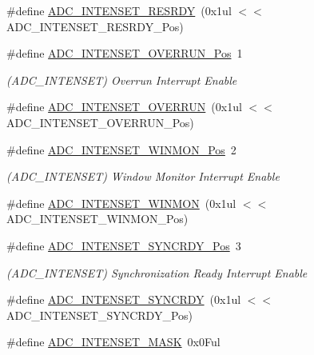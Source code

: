 \begin{DoxyCompactItemize}
\#define \mbox{\hyperlink{group___s_a_m_d21___a_d_c_ga9f32702bf0d530557a39ca292e51d1e4}{A\+D\+C\+\_\+\+I\+N\+T\+E\+N\+S\+E\+T\+\_\+\+R\+E\+S\+R\+DY}}~(0x1ul $<$$<$ A\+D\+C\+\_\+\+I\+N\+T\+E\+N\+S\+E\+T\+\_\+\+R\+E\+S\+R\+D\+Y\+\_\+\+Pos)
\item 
\#define \mbox{\hyperlink{group___s_a_m_d21___a_d_c_ga7d9b2895c1dcd0cd79242a303f9892ec}{A\+D\+C\+\_\+\+I\+N\+T\+E\+N\+S\+E\+T\+\_\+\+O\+V\+E\+R\+R\+U\+N\+\_\+\+Pos}}~1
\begin{DoxyCompactList}\small\item\em (A\+D\+C\+\_\+\+I\+N\+T\+E\+N\+S\+ET) Overrun Interrupt Enable \end{DoxyCompactList}\item 
\#define \mbox{\hyperlink{group___s_a_m_d21___a_d_c_ga00624ba4fc56a2fd9f608ea2c0540e9f}{A\+D\+C\+\_\+\+I\+N\+T\+E\+N\+S\+E\+T\+\_\+\+O\+V\+E\+R\+R\+UN}}~(0x1ul $<$$<$ A\+D\+C\+\_\+\+I\+N\+T\+E\+N\+S\+E\+T\+\_\+\+O\+V\+E\+R\+R\+U\+N\+\_\+\+Pos)
\item 
\#define \mbox{\hyperlink{group___s_a_m_d21___a_d_c_ga83db55040702e080d753687d992794af}{A\+D\+C\+\_\+\+I\+N\+T\+E\+N\+S\+E\+T\+\_\+\+W\+I\+N\+M\+O\+N\+\_\+\+Pos}}~2
\begin{DoxyCompactList}\small\item\em (A\+D\+C\+\_\+\+I\+N\+T\+E\+N\+S\+ET) Window Monitor Interrupt Enable \end{DoxyCompactList}\item 
\#define \mbox{\hyperlink{group___s_a_m_d21___a_d_c_ga9663d267bff1c4a71847d99528f1a424}{A\+D\+C\+\_\+\+I\+N\+T\+E\+N\+S\+E\+T\+\_\+\+W\+I\+N\+M\+ON}}~(0x1ul $<$$<$ A\+D\+C\+\_\+\+I\+N\+T\+E\+N\+S\+E\+T\+\_\+\+W\+I\+N\+M\+O\+N\+\_\+\+Pos)
\item 
\#define \mbox{\hyperlink{group___s_a_m_d21___a_d_c_ga0580970c443d86e97242784f558e1132}{A\+D\+C\+\_\+\+I\+N\+T\+E\+N\+S\+E\+T\+\_\+\+S\+Y\+N\+C\+R\+D\+Y\+\_\+\+Pos}}~3
\begin{DoxyCompactList}\small\item\em (A\+D\+C\+\_\+\+I\+N\+T\+E\+N\+S\+ET) Synchronization Ready Interrupt Enable \end{DoxyCompactList}\item 
\#define \mbox{\hyperlink{group___s_a_m_d21___a_d_c_ga9a4753b6b352596caf7473d73a454e1f}{A\+D\+C\+\_\+\+I\+N\+T\+E\+N\+S\+E\+T\+\_\+\+S\+Y\+N\+C\+R\+DY}}~(0x1ul $<$$<$ A\+D\+C\+\_\+\+I\+N\+T\+E\+N\+S\+E\+T\+\_\+\+S\+Y\+N\+C\+R\+D\+Y\+\_\+\+Pos)
\item 
\#define \mbox{\hyperlink{group___s_a_m_d21___a_d_c_ga348d47953ac9de47b878dd220e6359fd}{A\+D\+C\+\_\+\+I\+N\+T\+E\+N\+S\+E\+T\+\_\+\+M\+A\+SK}}~0x0\+Ful

\end{DoxyCompactItemize}
